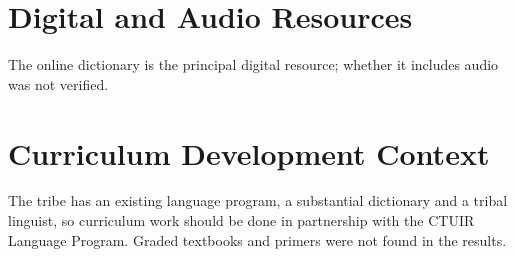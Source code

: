 \documentclass[12pt]{article}
\begin{document}
\section{Digital and Audio Resources}
The online dictionary is the principal digital resource; whether it includes audio was not verified.

\section{Curriculum Development Context}
The tribe has an existing language program, a substantial dictionary and a tribal linguist, so curriculum work should be done in partnership with the CTUIR Language Program. Graded textbooks and primers were not found in the results.
\end{document}
